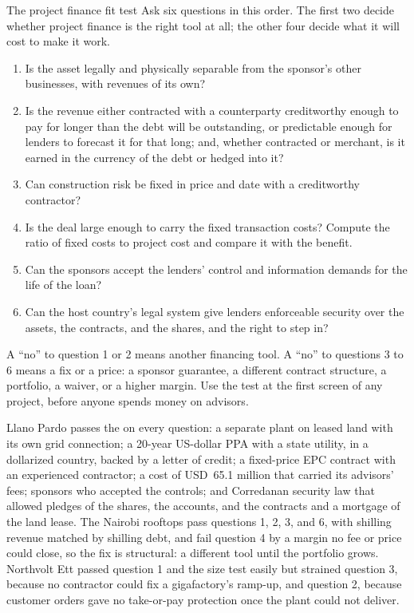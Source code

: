\begin{framework}[label={fw:pf-fit-test}]{The project finance fit test}
Ask six questions in this order. The first two decide whether project finance is the right tool at all; the other four decide what it will cost to make it work.
\begin{enumerate}
\item Is the asset legally and physically separable from the sponsor's other businesses, with revenues of its own?
\item Is the revenue either contracted with a counterparty creditworthy enough to pay for longer than the debt will be outstanding, or predictable enough for lenders to forecast it for that long; and, whether contracted or merchant, is it earned in the currency of the debt or hedged into it?
\item Can construction risk be fixed in price and date with a creditworthy contractor?
\item Is the deal large enough to carry the fixed transaction costs? Compute the ratio of fixed costs to project cost and compare it with the benefit.
\item Can the sponsors accept the lenders' control and information demands for the life of the loan?
\item Can the host country's legal system give lenders enforceable security over the assets, the contracts, and the shares, and the right to step in?
\end{enumerate}
A ``no'' to question 1 or 2 means another financing tool. A ``no'' to questions 3 to 6 means a fix or a price: a sponsor guarantee, a different contract structure, a portfolio, a waiver, or a higher margin. Use the test at the first screen of any project, before anyone spends money on advisors.
\end{framework}

Llano Pardo passes the  on every question: a separate plant on leased land with its own grid connection; a 20-year US-dollar PPA with a state utility, in a dollarized country, backed by a letter of credit; a fixed-price EPC contract with an experienced contractor; a cost of USD~65.1 million that carried its advisors' fees; sponsors who accepted the controls; and Corredanan security law that allowed pledges of the shares, the accounts, and the contracts and a mortgage of the land lease. The Nairobi rooftops pass questions 1, 2, 3, and 6, with shilling revenue matched by shilling debt, and fail question 4 by a margin no fee or price could close, so the fix is structural: a different tool until the portfolio grows. Northvolt Ett passed question 1 and the size test easily but strained question 3, because no contractor could fix a gigafactory's ramp-up, and question 2, because customer orders gave no take-or-pay protection once the plant could not deliver.

